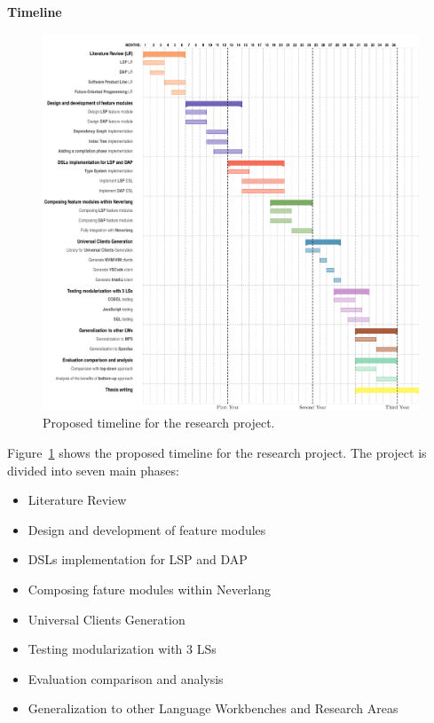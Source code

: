 \hfill \break
\noindent
\textbf{Timeline}

\hfill \break

\begin{figure}[btph]
    \centering
    \includegraphics[width=1\linewidth]{figs/gantt.pdf}
    \caption{Proposed timeline for the research project.}
    \label{fig:gantt}
\end{figure}

Figure~\ref{fig:gantt} shows the proposed timeline for the research project. The project is divided into seven main phases:
\begin{itemize}
    \item Literature Review
    \item Design and development of feature modules
    \item DSLs implementation for LSP and DAP
    \item Composing fature modules within Neverlang
    \item Universal Clients Generation
    \item Testing modularization with 3 LSs
    \item Evaluation comparison and analysis
    \item Generalization to other Language Workbenches and Research Areas
\end{itemize}

